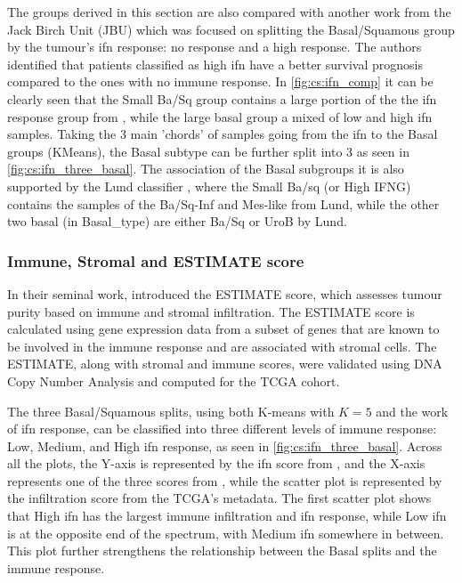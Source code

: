 The groups derived in this section are also compared with another work \citet{Baker2022-bj} from the Jack Birch Unit (JBU) which was focused on splitting the Basal/Squamous group by the tumour's \acrfull{ifn} response: no response and a high response. The authors identified that patients classified as high \acrshort{ifn} have a better survival prognosis compared to the ones with no immune response. In \cref{fig:cs:ifn_comp} it can be clearly seen that the Small Ba/Sq group contains a large portion of the the \acrshort{ifn} response group from \citet{Baker2022-bj}, while the large basal group a mixed of low and high \acrshort{ifn} samples. Taking the 3 main 'chords' of samples going from the \acrshort{ifn} to the Basal groups (KMeans), the Basal subtype can be further split into 3 as seen in \cref{fig:cs:ifn_three_basal}. The association of the Basal subgroups it is also supported by the Lund classifier \citet{Marzouka2018-ge}, where the Small Ba/sq (or High IFNG) contains the samples of the Ba/Sq-Inf and Mes-like from Lund, while the other two basal (in Basal\_type) are either Ba/Sq or UroB by Lund.

\subsubsection{Immune, Stromal and ESTIMATE score}

In their seminal work, \citet{Yoshihara2013-wq} introduced the ESTIMATE score, which assesses tumour purity based on immune and stromal infiltration. The ESTIMATE score is calculated using gene expression data from a subset of genes that are known to be involved in the immune response and are associated with stromal cells. The ESTIMATE, along with stromal and immune scores, were validated using DNA Copy Number Analysis and computed for the TCGA cohort.

The three Basal/Squamous splits, using both K-means with \( K = 5 \) and the work of \acrshort{ifn} response, can be classified into three different levels of immune response: Low, Medium, and High \acrshort{ifn} response, as seen in \cref{fig:cs:ifn_three_basal}. Across all the plots, the Y-axis is represented by the \acrshort{ifn} score from \citet{Baker2022-bj}, and the X-axis represents one of the three scores from \citet{Yoshihara2013-wq}, while the scatter plot is represented by the infiltration score from the TCGA's metadata. The first scatter plot shows that High \acrshort{ifn} has the largest immune infiltration and \acrshort{ifn} response, while Low \acrshort{ifn} is at the opposite end of the spectrum, with Medium \acrshort{ifn} somewhere in between. This plot further strengthens the relationship between the Basal splits and the immune response.

